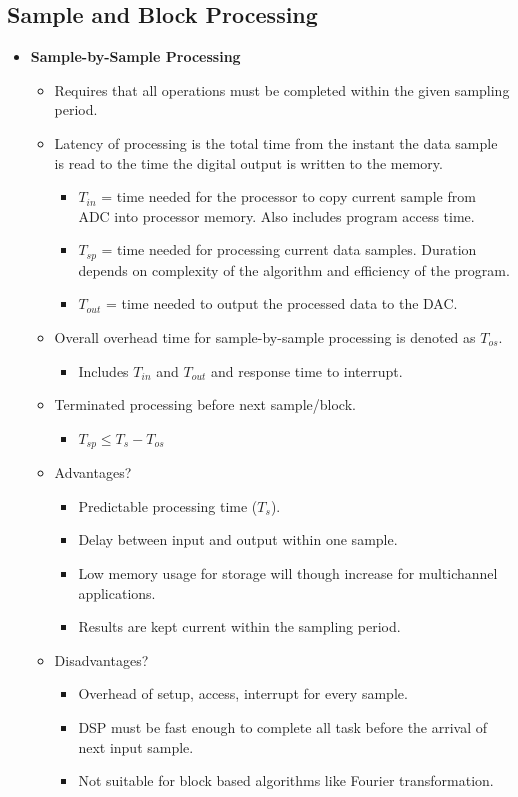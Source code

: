 \subsection{Sample and Block Processing}
\begin{itemize}
	\item \textbf{Sample-by-Sample Processing}
	\begin{itemize}
		\item Requires that all operations must be completed within the given sampling period.
		\item Latency of processing is the total time from the instant the data sample is read to the time the digital output is written to the memory.
		\begin{itemize}
			\item $T_{in}$ = time needed for the processor to copy current sample from ADC into processor memory. Also includes program access time.
			\item $T_{sp}$ = time needed for processing current data samples. Duration depends on complexity of the algorithm and efficiency of the	program.
			\item $T_{out}$ = time needed to output the processed data to the DAC.
		\end{itemize}
		\item Overall overhead time for sample-by-sample processing is denoted as $T_{os}$.
		\begin{itemize}
			\item Includes $T_{in}$ and $T_{out}$ and response time to interrupt.
		\end{itemize}
		\item Terminated processing before next sample/block. 
		\begin{itemize}
			\item $T_{sp} \leq T_s - T_{os}$
		\end{itemize}
		\item Advantages?
		\begin{itemize}
			\item Predictable processing time ($T_s$).
			\item Delay between input and output within one sample.
			\item Low memory usage for storage will though increase for multichannel applications.
			\item Results are kept current within the sampling period.
		\end{itemize}
		\item Disadvantages?
		\begin{itemize}
			\item Overhead of setup, access, interrupt for every sample.
			\item DSP must be fast enough to complete all task	before the arrival of next input sample.
			\item Not suitable for block based algorithms like Fourier transformation.
		\end{itemize} 
	\end{itemize}
\end{itemize}

